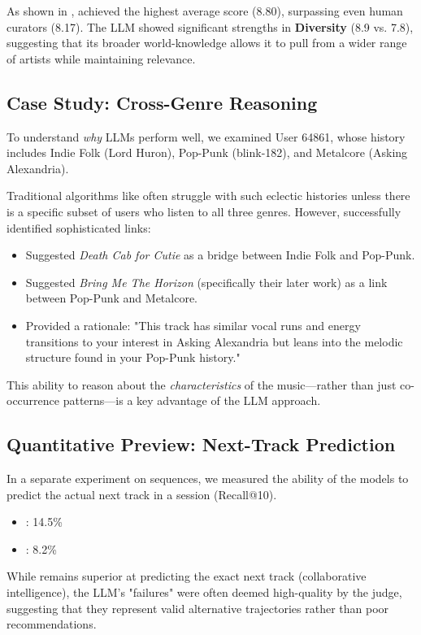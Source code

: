 As shown in , \claudesonnet achieved the highest average score (8.80), surpassing even human curators (8.17). The LLM showed significant strengths in {\bf Diversity} (8.9 vs. 7.8), suggesting that its broader world-knowledge allows it to pull from a wider range of artists while maintaining relevance.

\subsection{Case Study: Cross-Genre Reasoning}

To understand {\em why} LLMs perform well, we examined User 64861, whose history includes Indie Folk (Lord Huron), Pop-Punk (blink-182), and Metalcore (Asking Alexandria).

Traditional algorithms like \bpr often struggle with such eclectic histories unless there is a specific subset of users who listen to all three genres. However, \claudesonnet successfully identified sophisticated links:
\begin{itemize}[leftmargin=*,itemsep=0pt,topsep=0pt]
    \item Suggested {\em Death Cab for Cutie} as a bridge between Indie Folk and Pop-Punk.
    \item Suggested {\em Bring Me The Horizon} (specifically their later work) as a link between Pop-Punk and Metalcore.
    \item Provided a rationale: "This track has similar vocal runs and energy transitions to your interest in Asking Alexandria but leans into the melodic structure found in your Pop-Punk history."
\end{itemize}

This ability to reason about the {\em characteristics} of the music---rather than just co-occurrence patterns---is a key advantage of the LLM approach.

\subsection{Quantitative Preview: Next-Track Prediction}

In a separate experiment on \spotifydata sequences, we measured the ability of the models to predict the actual next track in a session (Recall@10).
\begin{itemize}[leftmargin=*,itemsep=0pt,topsep=0pt]
    \item {\bf \bpr}: 14.5\%
    \item {\bf \claudesonnet}: 8.2\%
\end{itemize}
While \bpr remains superior at predicting the exact next track (collaborative intelligence), the LLM's "failures" were often deemed high-quality by the judge, suggesting that they represent valid alternative trajectories rather than poor recommendations.
